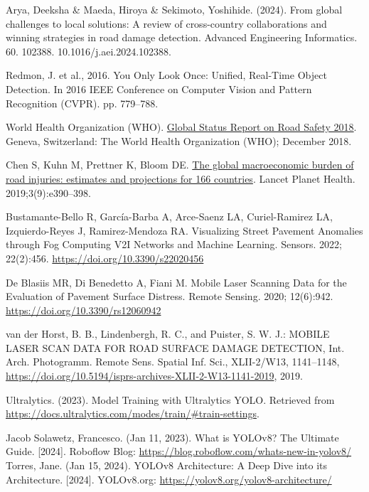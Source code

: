 \begin{thebibliography}{10}
        Arya, Deeksha \& Maeda, Hiroya \& Sekimoto, Yoshihide. (2024). From global challenges to local solutions: A review of cross-country collaborations and winning strategies in road damage detection. Advanced Engineering Informatics. 60. 102388. 10.1016/j.aei.2024.102388. 

        Redmon, J. et al., 2016. You Only Look Once: Unified, Real-Time Object Detection. In 2016 IEEE Conference on Computer Vision and Pattern Recognition (CVPR). pp. 779–788.

        World Health Organization (WHO). \href{https://www.who.int/publications/i/item/9789241565684}{Global Status Report on Road Safety 2018}. Geneva, Switzerland: The World Health Organization (WHO); December 2018.
        
        Chen S, Kuhn M, Prettner K, Bloom DE. \href{https://www.sciencedirect.com/science/article/pii/S2542519619301706}{The global macroeconomic burden of road injuries: estimates and projections for 166 countries}. Lancet Planet Health. 2019;3(9):e390–398.

        Bustamante-Bello R, García-Barba A, Arce-Saenz LA, Curiel-Ramirez LA, Izquierdo-Reyes J, Ramirez-Mendoza RA. Visualizing Street Pavement Anomalies through Fog Computing V2I Networks and Machine Learning. Sensors. 2022; 22(2):456. \url{https://doi.org/10.3390/s22020456}

        De Blasiis MR, Di Benedetto A, Fiani M. Mobile Laser Scanning Data for the Evaluation of Pavement Surface Distress. Remote Sensing. 2020; 12(6):942. \url{https://doi.org/10.3390/rs12060942}

        van der Horst, B. B., Lindenbergh, R. C., and Puister, S. W. J.: MOBILE LASER SCAN DATA FOR ROAD SURFACE DAMAGE DETECTION, Int. Arch. Photogramm. Remote Sens. Spatial Inf. Sci., XLII-2/W13, 1141–1148, \url{https://doi.org/10.5194/isprs-archives-XLII-2-W13-1141-2019}, 2019.

        Ultralytics. (2023). Model Training with Ultralytics YOLO.
        Retrieved from \url{https://docs.ultralytics.com/modes/train/#train-settings}.

        Jacob Solawetz, Francesco. (Jan 11, 2023). What is YOLOv8? The Ultimate Guide. [2024]. Roboflow Blog: \url{https://blog.roboflow.com/whats-new-in-yolov8/
}
        Torres, Jane. (Jan 15, 2024). YOLOv8 Architecture: A Deep Dive into its Architecture. [2024]. YOLOv8.org: \url{https://yolov8.org/yolov8-architecture/}


\end{thebibliography}

